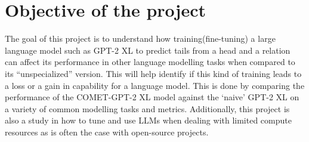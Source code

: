 \documentclass[\main/thesis.tex]{subfiles}
\begin{document}
\chapter{Objective of the project}

The goal of this project is to understand how training(fine-tuning) a large language model such as GPT-2 XL 
to predict tails from a head and a relation \cite{hwang_comet-atomic_2020} can affect its performance 
in other language modelling tasks when compared to its ``unspecialized'' version. This will help identify if this kind 
of training leads to a loss or a gain in capability for a language model.
This is done by comparing the performance of the COMET-GPT-2 XL\cite{west_symbolic_2021} model against the `naive' 
GPT-2 XL on a variety of common modelling tasks and metrics. Additionally, this project is also a study in how to tune and use 
LLMs when dealing with limited compute resources as is often the case with open-source projects. 
\end{document}
